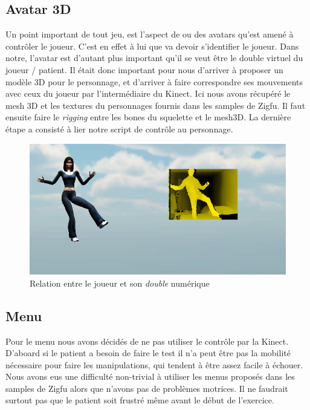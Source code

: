 \subsection{Avatar 3D}   
Un point important de tout jeu, est l'aspect de ou des avatars qu'est amené à contrôler le joueur. C'est en effet à lui que va devoir s'identifier le joueur. Dans notre, l'avatar est d'autant plus important qu'il se veut être le double virtuel du joueur / patient. Il était donc important pour nous d'arriver à proposer un modèle 3D pour le personnage, et d'arriver à faire correspondre ses mouvements avec ceux du joueur par l'intermédiaire du Kinect. Ici nous avons récupéré le mesh 3D et les textures du personnages fournis dans les samples de Zigfu. Il faut ensuite faire le \textit{rigging} entre les bones du squelette et le mesh3D. La dernière étape a consisté à lier notre script de contrôle au personnage.
\begin{figure}
\begin{center}
  \includegraphics[scale=1]{images/avatar3D.png} \caption{Relation entre le joueur et son \textit{double} numérique}
\end{center}
\end{figure}

    
\subsection{Menu}

Pour le menu nous avons décidés de ne pas utiliser le contrôle par la Kinect.
D'aboard si le patient a besoin de faire le test il n'a peut être pas la
mobilité nécessaire pour faire les manipulations, qui tendent à être assez 
facile à échouer. Nous avons eus une difficulté non-trivial à utiliser les menus
proposés dans les samples de Zigfu alors que n'avons pas de problèmes motrices.
Il ne faudrait surtout pas que le patient soit frustré même avant le début de
l'exercice.
    

